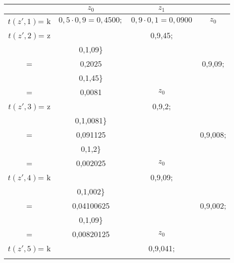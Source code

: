 \begin{center}
\begin{tabular}{cccc}
				& \(z_{0}\) & \(z_{1}\) & \\ \hline
\(t(z',1)\)= k	& \(0,5\cdot0,9 = 0,4500;\) & \(0,9\cdot0,1 = 0,0900\) & \(z_{0}\) \\ \hline
\(t(z',2)\)= z	& \(	\begin{array} {r@{}l@{}}
							0,5\cdot\max\{	& 0,9\cdot0,45; \\
											& 0,1\cdot0,09\}\\
										   =& 0,2025
					\end{array}
					\)
				&  \(	\begin{array} {r@{}l@{}}
							0,1\cdot\max\{	& 0,9\cdot0,09; \\
											& 0,1\cdot0,45\}\\
										   =& 0,0081
					\end{array}
					\) & \(z_{0}\) \\ \hline
\(t(z',3)\)= z	& \(	\begin{array} {r@{}l@{}}
							0,5\cdot\max\{	& 0,9\cdot0,2; \\
											& 0,1\cdot0,0081\}\\
										   =& 0,091125
					\end{array}
					\)
				&   \(	\begin{array} {r@{}l@{}}
							0,1\cdot\max\{	& 0,9\cdot0,008; \\
											& 0,1\cdot0,2\}\\
										   =& 0,002025
					\end{array}
					\) & \(z_{0}\)\\ \hline
\(t(z',4)\)= k	& \(	\begin{array} {r@{}l@{}}
							0,5\cdot\max\{	& 0,9\cdot0,09; \\
											& 0,1\cdot0,002\}\\
										   =& 0,04100625
					\end{array}
					\)
				&   \(	\begin{array} {r@{}l@{}}
							0,9\cdot\max\{	& 0,9\cdot0,002; \\
											& 0,1\cdot0,09\}\\
										   =& 0,00820125
					\end{array}
					\) & \(z_{0}\)\\ \hline
\(t(z',5)\)= k	& \(	\begin{array} {r@{}l@{}}
							0,5\cdot\max\{	& 0,9\cdot0,041; \\

\end{array}
\end{tabular}
\end{center}
